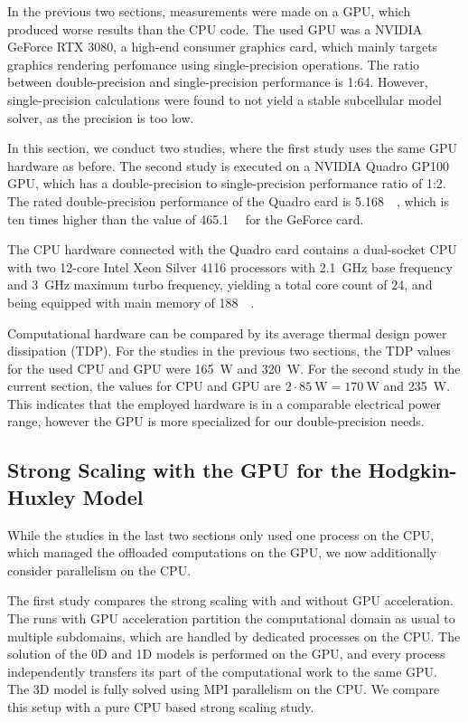 In the previous two sections, measurements were made on a GPU, which produced worse results than the CPU code. The used GPU was a NVIDIA GeForce RTX 3080, a high-end consumer graphics card, which mainly targets graphics rendering perfomance using single-precision operations. The ratio between double-precision and single-precision performance is 1:64. However, single-precision calculations were found to not yield a stable subcellular model solver, as the precision is too low. 

In this section, we conduct two studies, where the first study uses the same GPU hardware as before. The second study is executed on a NVIDIA Quadro GP100 GPU, which has a double-precision to single-precision performance ratio of 1:2.
The rated double-precision performance of the Quadro card is \SI{5.168}{\tera\flops}, which is ten times higher than the value of \SI{465.1}{\giga\flops} for the GeForce card. 

The CPU hardware connected with the Quadro card contains a dual-socket CPU with two 12-core Intel Xeon Silver 4116 processors with \SI{2.1}{\giga\hertz} base frequency and \SI{3}{\giga\hertz} maximum turbo frequency, yielding a total core count of 24, and being equipped with main memory of \SI{188}{\gibi\byte}. 

Computational hardware can be compared by its average thermal design power dissipation (TDP). For the studies in the previous two sections, the TDP values for the used CPU and GPU were \SI{165}{\watt} and \SI{320}{\watt}. For the second study in the current section, the values for CPU and GPU are $2\cdot \SI{85}{\watt} = \SI{170}{\watt}$ and \SI{235}{\watt}. This indicates that the employed hardware is in a comparable electrical power range, however the GPU is more specialized for our double-precision needs.

\subsection{Strong Scaling with the GPU for the Hodgkin-Huxley Model}\label{sec:strong_scaling_gpu_hodgkin_huxley}

While the studies in the last two sections only used one process on the CPU, which managed the offloaded computations on the GPU,
we now additionally consider parallelism on the CPU.

The first study compares the strong scaling with and without GPU acceleration. The runs with GPU acceleration partition the computational domain as usual to multiple subdomains, which are handled by dedicated processes on the CPU. The solution of the 0D and 1D models is performed on the GPU, and every process independently transfers its part of the computational work to the same GPU. The 3D model is fully solved using MPI parallelism on the CPU. We compare this setup with a pure CPU based strong scaling study.

